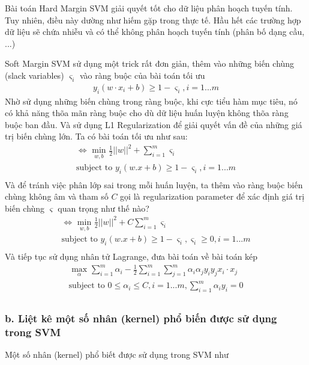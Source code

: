 \documentclass{article}
\begin{document}
	Bài toán Hard Margin SVM giải quyết tốt cho dữ liệu phân hoạch tuyến tính. Tuy nhiên, điều này dường như hiếm gặp trong thực tế. Hầu hết các trường hợp dữ liệu sẽ chứa nhiễu và có thể không phân hoạch tuyến tính (phân bố dạng cầu, ...)
	
	Soft Margin SVM sử dụng một trick rất đơn giản, thêm vào những biến chùng (slack variables) $\varsigma_i$ vào ràng buộc của bài toán tối ưu
	\begin{gather*}
		y_i(w \cdot x_i + b) \geq 1 - \varsigma_i, i =1...m
	\end{gather*}
	Nhờ sử dụng những biến chùng trong ràng buộc, khi cực tiểu hàm mục tiêu, nó có khả năng thõa mãn ràng buộc cho dù dữ liệu huấn luyện không thõa ràng buộc ban đầu. Và sử dụng L1 Regularization để giải quyết vấn đề của những giá trị biến chùng lớn. Ta có bài toán tối ưu như sau:
	\begin{gather*}
		\Leftrightarrow \underset{w, b}{\text{ min }}\frac{1}{2}||w||^2 + \sum_{i=1}^m\varsigma_i\\
		\text{subject to } y_i(w.x+b) \geq 1 - \varsigma_i, i = 1...m \\
	\end{gather*}
	Và để tránh việc phân lớp sai trong mỗi huấn luyện, ta thêm vào ràng buộc biến chùng không âm và tham số $C$ gọi là regularization parameter để xác định giá trị biến chùng $\varsigma$ quan trọng như thế nào?
	\begin{gather*}
		\Leftrightarrow \underset{w, b}{\text{ min }}\frac{1}{2}||w||^2 + C\sum_{i=1}^m\varsigma_i\\
		\text{subject to } y_i(w.x+b) \geq 1 - \varsigma_i, \varsigma_i \geq 0, i = 1...m \\
	\end{gather*}
	Và tiếp tục sử dụng nhân tử Lagrange, đưa bài toán về bài toán kép
	\begin{gather*}
		\underset{\alpha}{\text{ max }}\sum_{i=1}^m\alpha_i - \frac{1}{2}\sum_{i=1}^m\sum_{j=1}^m\alpha_i\alpha_j y_i y_j x_i \cdot x_j\\
		\text{subject to } 0 \leq \alpha_i \leq C, i = 1...m,  \sum_{i=1}^m\alpha_iy_i = 0\\
	\end{gather*}
	\subsubsection{b. Liệt kê một số nhân (kernel) phổ biến được sử dụng trong SVM}
	Một số nhân (kernel) phổ biết được sử dụng trong SVM như
	
\end{document}
